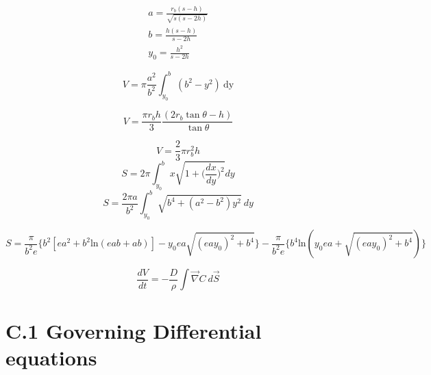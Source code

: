 \begin{equation}\tag{B-2}
    \begin{aligned}
    a=\frac{r_{b}(s-h)}{\sqrt{s(s-2h)}}\\
    b=\frac{h(s-h)}{s-2h}\\
    y_{0}=\frac{h^{2}}{s-2h}
    \end{aligned}
\end{equation}

\begin{equation}\tag{B-3}
    V=\pi \frac{a^{2}}{b^{2}} \int_{y_{0}}^{b} (b^{2}-y^{2})~\mbox{dy}
\end{equation}

\begin{equation}\tag{B-4}
    V=\frac{\pi r_{b}h}{3} \frac{(2r_{b}\tan \theta - h)}{\tan \theta}
\end{equation}

\begin{equation}\tag{B-5}
    V=\frac{2}{3}\pi r_{b}^{2}h
\end{equation}
\begin{equation}\tag{B-6}
    S=2\pi \int_{y_{0}}^{b}x\sqrt{1+\Bigg(\frac{dx}{dy}\Bigg)^{2}}dy
\end{equation}
\begin{equation}\tag{B-7}
    S=\frac{2 \pi a}{b^{2}} \int_{y_{0}}^{b}\sqrt{b^{4}+(a^{2}-b^{2})y^{2}}~dy
\end{equation}

\begin{equation}\tag{B-8}
S=\frac{\pi}{b^{2}e} \Bigg\{b^{2}[ea^{2}+b^{2}\mbox{ln}(eab+ab)]-y_{0}ea\sqrt{(eay_{0})^{2}+b^{4}}\Bigg\}-\frac{\pi}{b^{2}e} \Bigg\{b^{4}\mbox{ln}(y_{0}ea+\sqrt{(eay_{0})^{2}+b^{4}})\Bigg\}
\end{equation}

\begin{equation}\tag{B-9}
    \frac{dV}{dt}=-\frac{D}{\rho}\int \Vec{\nabla}C~ d\Vec{S}
\end{equation}


\section*{C.1 \quad Governing Differential equations}

